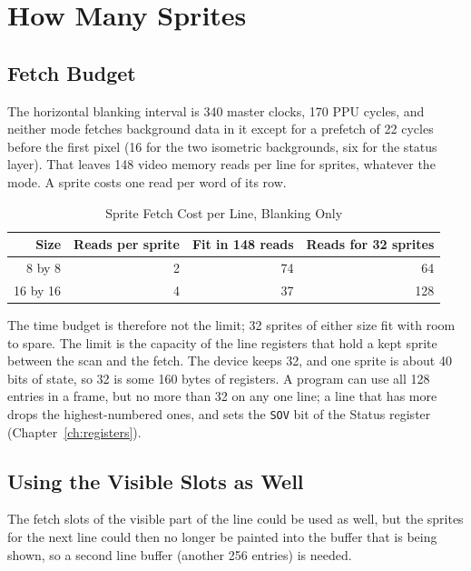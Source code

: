 \section{How Many Sprites}
\label{sec:sprite-budget}

\subsection{Fetch Budget}

The horizontal blanking interval is 340 master clocks, 170 PPU cycles, and neither mode fetches background data in it
except for a prefetch of 22 cycles before the first pixel (16 for the two isometric backgrounds, six for the status
layer). That leaves 148 video memory reads per line for sprites, whatever the mode. A sprite costs one read per word of
its row.

\begin{table}[H]
	\centering
	\begin{tabular}{rrrr}
		\toprule
		\textbf{Size} & \textbf{Reads per sprite} & \textbf{Fit in 148 reads} & \textbf{Reads for 32 sprites} \\
		\midrule
		8 by 8        & 2                         & 74                        & 64                            \\
		16 by 16      & 4                         & 37                        & 128                           \\
		\bottomrule
	\end{tabular}
	\caption{Sprite Fetch Cost per Line, Blanking Only}
	\label{tab:sprite-budget}
\end{table}

The time budget is therefore not the limit; 32 sprites of either size fit with room to spare. The limit is the capacity
of the line registers that hold a kept sprite between the scan and the fetch. The device keeps 32, and one sprite is
about 40 bits of state, so 32 is some 160 bytes of registers. A program can use all 128 entries in a frame, but no more
than 32 on any one line; a line that has more drops the highest-numbered ones, and sets the \texttt{SOV} bit of the
Status register (Chapter~\ref{ch:registers}).

\subsection{Using the Visible Slots as Well}

The fetch slots of the visible part of the line could be used as well, but the sprites for the next line could then no
longer be painted into the buffer that is being shown, so a second line buffer (another 256 entries) is needed.

